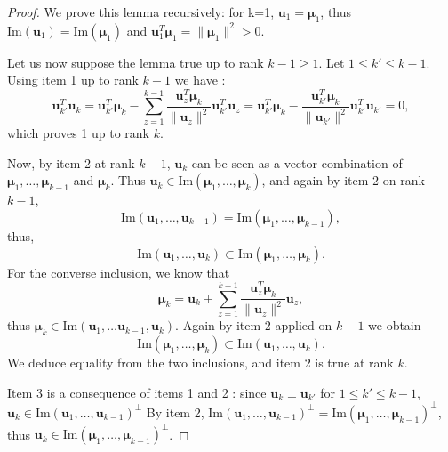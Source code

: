 \documentclass{article}
\def\mmu{\boldsymbol{\mu}}
\def\uu{\mathbf{u}}
\begin{document}
\begin{proof}
    We prove this lemma recursively: for k=1, $\uu_1 = \mmu_1$, thus $\mathrm{Im}(\uu_1) = \mathrm{Im}(\mmu_1)$ and $\uu_1^T\mmu_1 = \| \mmu_1\|^2 > 0$.
    
    Let us now suppose the lemma true up to rank $k-1 \geq 1$.
    Let $1\leq k' \leq k-1$. Using item 1 up to rank $k-1$ we have :
    \begin{equation}
        \uu_{k'}^T \uu_k = \uu_{k'}^T \mmu_k - \sum_{z=1}^{k-1} \dfrac{\uu_z^T \mmu_k}{\| \uu_z \|^2} \uu_{k'}^T\uu_z
        = \uu_{k'}^T \mmu_k -  \dfrac{\uu_{k'}^T \mmu_k}{\| \uu_{k'} \|^2} \uu_{k'}^T\uu_{k'}  = 0,
    \end{equation}
    which proves 1 up to rank $k$.
    
    Now, by item 2 at rank $k-1$, $\uu_k$ can be seen as a vector combination of $\mmu_1, \dots, \mmu_{k-1}$ and $ \mmu_k$. Thus $\uu_k \in \mathrm{Im} (\mmu_1, \dots, \mmu_k)$, and again by item 2 on rank $k-1$,  
    \begin{equation}
        \mathrm{Im}(\uu_1, \dots, \uu_{k-1}) = \mathrm{Im}(\mmu_1, \dots, \mmu_{k-1}), 
    \end{equation}
    thus, 
    \begin{equation}
     \mathrm{Im}(\uu_1, \dots, \uu_k) \subset \mathrm{Im}(\mmu_1, \dots, \mmu_k)  . 
    \end{equation}
    For the converse inclusion, we know that 
    \begin{equation}
        \mmu_k = \uu_k + \sum_{z=1}^{k-1} \dfrac{\uu_z^T \mmu_k}{\| \uu_z \|^2} \uu_z, 
    \end{equation} 
    thus $\mmu_k \in \mathrm{Im}(\uu_1, \dots \uu_{k-1}, \uu_k)$.
    Again by item 2 applied on $k-1$ we obtain
    \begin{equation}
    \mathrm{Im}(\mmu_1, \dots, \mmu_k) \subset \mathrm{Im}(\uu_1, \dots, \uu_k).    
    \end{equation}
    We deduce equality from the two inclusions, and item 2 is true at rank $k$. 
    
    Item 3 is a consequence of items 1 and 2 :  since $\uu_k \perp \uu_{k'}$ for $1\leq k' \leq k-1$, $\uu_k \in \mathrm{Im}(\uu_1, \dots, \uu_{k-1})^\perp$ By item 2, $\mathrm{Im}(\uu_1, \dots, \uu_{k-1})^\perp = \mathrm{Im}(\mmu_1, \dots, \mmu_{k-1})^\perp$, thus $\uu_k \in \mathrm{Im}(\mmu_1, \dots, \mmu_{k-1})^\perp$.


\end{proof}
\end{document}
